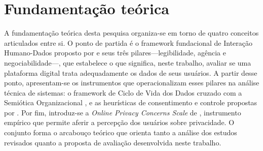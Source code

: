 \documentclass[
	12pt,				%
	oneside,			%
	a4paper,			%
	english,			%
	brazil				%
	]{abntex2ppgsi}
\begin{document}



\chapter{Fundamentação teórica}

    A fundamentação teórica desta pesquisa organiza-se em torno 
    de quatro conceitos articulados entre si. O ponto de partida 
    é o framework fundacional de Interação Humano-Dados proposto 
    por  e 
    seus três pilares---legibilidade, agência e 
    negociabilidade---, que estabelece o que significa, neste 
    trabalho, avaliar se uma plataforma digital trata 
    adequadamente os dados de seus usuários. A partir desse 
    ponto, apresentam-se os instrumentos que operacionalizam 
    esses pilares na análise técnica de sistemas: o framework 
    de Ciclo de Vida dos Dados cruzado com a Semiótica 
    Organizacional \cite{Hornung2015}, e as heurísticas de 
    consentimento e controle propostas por 
    . Por fim, introduz-se 
    a \textit{Online Privacy Concerns Scale} de 
    , instrumento empírico 
    que permite aferir a percepção dos usuários sobre 
    privacidade. O conjunto forma o arcabouço teórico que 
    orienta tanto a análise dos estudos revisados quanto a 
    proposta de avaliação desenvolvida neste trabalho.
\end{document}
